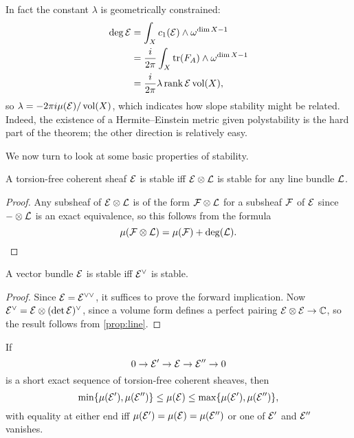 In fact the constant $\lambda$ is geometrically constrained:
\begin{align*}
    \deg\mathcal{E}
        &= \int_Xc_1(\mathcal{E})\wedge\omega^{\dim X-1} \\
        &= \frac{i}{2\pi}\int_X\operatorname{tr}(F_A)\wedge\omega^{\dim X-1} \\
        &= \frac{i}{2\pi}\lambda\operatorname{rank}\mathcal{E}\operatorname{vol}(X),
\end{align*}
so $\lambda=-2\pi i\mu(\mathcal{E})/\operatorname{vol}(X)$, which indicates how slope stability
might be related. Indeed, the existence of a Hermite--Einstein metric given
polystability is the hard part of the theorem; the other direction is relatively
easy.

We now turn to look at some basic properties of stability.

\begin{proposition}\label{prop:line}
    A torsion-free coherent sheaf $\mathcal{E}$ is stable iff $\mathcal{E}\otimes\mathcal{L}$ is
    stable for any line bundle $\mathcal{L}$.
\end{proposition}

\begin{proof}
    Any subsheaf of $\mathcal{E}\otimes\mathcal{L}$ is of the form $\mathcal{F}\otimes\mathcal{L}$ for
    a subsheaf $\mathcal{F}$ of $\mathcal{E}$ since $-\otimes\mathcal{L}$ is an exact equivalence,
    so this follows from the formula
    \begin{equation*}
        \mu(\mathcal{F}\otimes\mathcal{L}) = \mu(\mathcal{F}) + \deg(\mathcal{L}).
    \end{equation*}
\end{proof}

\begin{proposition}\label{prop:stable dual}
    A vector bundle $\mathcal{E}$ is stable iff $\mathcal{E}^\vee$ is stable.
\end{proposition}

\begin{proof}
    Since $\mathcal{E}=\mathcal{E}^{\vee\vee}$, it suffices to prove the forward
    implication. Now $\mathcal{E}^\vee=\mathcal{E}\otimes(\det\mathcal{E})^\vee$, since a volume
    form defines a perfect pairing $\mathcal{E}\otimes\mathcal{E}\to\mathbb{C}$, so the result
    follows from \cref{prop:line}.
\end{proof}

\begin{proposition}\label{prop:slope SES}
    If
    \begin{equation*}
        0\to\mathcal{E}'\to\mathcal{E}\to\mathcal{E}''\to0
    \end{equation*}
    is a short exact sequence of torsion-free coherent sheaves, then
    \begin{equation*}
        \min\{\mu(\mathcal{E}'),\mu(\mathcal{E}'')\}
            \le \mu(\mathcal{E}) \le \max\{\mu(\mathcal{E}'),\mu(\mathcal{E}'')\},
    \end{equation*}
    with equality at either end iff $\mu(\mathcal{E}')=\mu(\mathcal{E})=\mu(\mathcal{E}'')$ or one
    of $\mathcal{E}'$ and $\mathcal{E}''$ vanishes.
\end{proposition}

